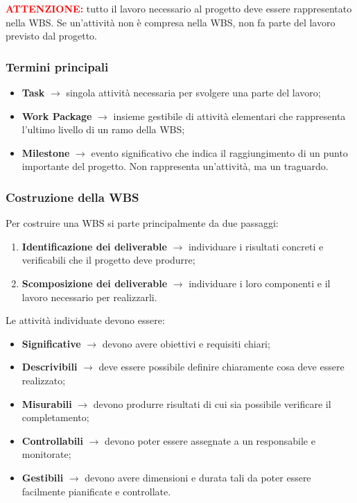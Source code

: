 \noindent\textbf{\textcolor{red}{ATTENZIONE:}} tutto il lavoro necessario al progetto deve essere rappresentato nella WBS. Se un'attività non è compresa nella WBS, non fa parte 
del lavoro previsto dal progetto.

\subsubsection*{Termini principali}
\begin{itemize}
    \item \textbf{Task} $\rightarrow$ singola attività necessaria per svolgere una parte del lavoro;
    \item \textbf{Work Package} $\rightarrow$ insieme gestibile di attività elementari che rappresenta l'ultimo livello di un ramo della WBS;
    \item \textbf{Milestone} $\rightarrow$ evento significativo che indica il raggiungimento di un punto importante del progetto. Non rappresenta un'attività, ma un traguardo.
\end{itemize}

\subsubsection*{Costruzione della WBS}
Per costruire una WBS si parte principalmente da due passaggi:
\begin{enumerate}
    \item \textbf{Identificazione dei deliverable} $\rightarrow$ individuare i risultati concreti e verificabili che il progetto deve produrre;
    \item \textbf{Scomposizione dei deliverable} $\rightarrow$ individuare i loro componenti e il lavoro necessario per realizzarli.
\end{enumerate}

\noindent Le attività individuate devono essere:
\begin{itemize}
    \item \textbf{Significative} $\rightarrow$ devono avere obiettivi e requisiti chiari;
    \item \textbf{Descrivibili} $\rightarrow$ deve essere possibile definire chiaramente cosa deve essere realizzato;
    \item \textbf{Misurabili} $\rightarrow$ devono produrre risultati di cui sia possibile verificare il completamento;
    \item \textbf{Controllabili} $\rightarrow$ devono poter essere assegnate a un responsabile e monitorate;
    \item \textbf{Gestibili} $\rightarrow$ devono avere dimensioni e durata tali da poter essere facilmente pianificate e controllate.
\end{itemize}

